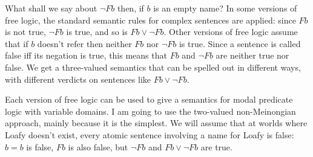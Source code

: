 What shall we say about $\neg Fb$ then, if $b$ is an empty name? In some
versions of free logic, the standard semantic rules for complex sentences are
applied: since $Fb$ is not true, $\neg Fb$ is true, and so is $Fb \lor \neg Fb$.
Other versions of free logic assume that if $b$ doesn't refer then neither $Fb$
nor $\neg Fb$ is true. Since a sentence is called false iff its negation is
true, this means that $Fb$ and $\neg Fb$ are neither true nor false. We get a
three-valued semantics that can be spelled out in different ways, with different
verdicts on sentences like $Fb \lor \neg Fb$.

Each version of free logic can be used to give a semantics for modal predicate
logic with variable domains. I am going to use the two-valued non-Meinongian
approach, mainly because it is the simplest. We will assume that at worlds where
Loafy doesn't exist, every atomic sentence involving a name for Loafy is false:
$b=b$ is false, $Fb$ is also false, but $\neg Fb$ and $Fb \lor \neg Fb$ are
true.


